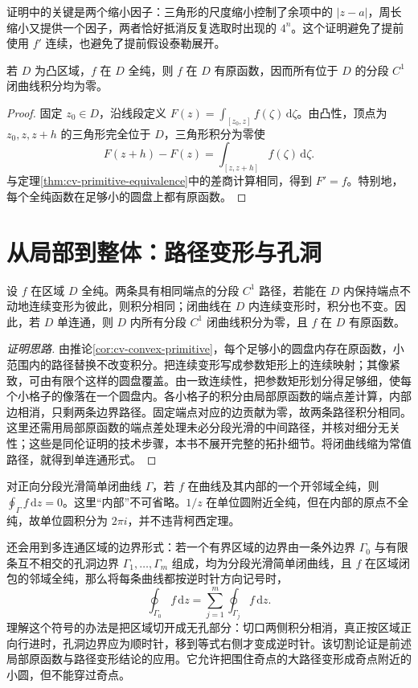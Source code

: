 \documentclass[UTF8,12pt,a4paper,fontset=fandol]{ctexbook}
\begin{document}
证明中的关键是两个缩小因子：三角形的尺度缩小控制了余项中的 $|z-a|$，周长缩小又提供一个因子，两者恰好抵消反复选取时出现的 $4^n$。这个证明避免了提前使用 $f'$ 连续，也避免了提前假设泰勒展开。

\begin{corollary}[凸区域上的原函数]
\label{cor:cv-convex-primitive}
若 $D$ 为凸区域，$f$ 在 $D$ 全纯，则 $f$ 在 $D$ 有原函数，因而所有位于 $D$ 的分段 $C^1$ 闭曲线积分均为零。
\end{corollary}
\begin{proof}
固定 $z_0\in D$，沿线段定义 $F(z)=\int_{[z_0,z]}f(\zeta)\,\mathrm d\zeta$。由凸性，顶点为 $z_0,z,z+h$ 的三角形完全位于 $D$，三角形积分为零使
\[
 F(z+h)-F(z)=\int_{[z,z+h]}f(\zeta)\,\mathrm d\zeta.
\]
与定理\ref{thm:cv-primitive-equivalence}中的差商计算相同，得到 $F'=f$。特别地，每个全纯函数在足够小的圆盘上都有原函数。
\end{proof}

\section{从局部到整体：路径变形与孔洞}

\begin{theorem}[同伦不变性与单连通形式]
\label{thm:cv-cauchy-domain}
设 $f$ 在区域 $D$ 全纯。两条具有相同端点的分段 $C^1$ 路径，若能在 $D$ 内保持端点不动地连续变形为彼此，则积分相同；闭曲线在 $D$ 内连续变形时，积分也不变。因此，若 $D$ 单连通，则 $D$ 内所有分段 $C^1$ 闭曲线积分为零，且 $f$ 在 $D$ 有原函数。
\end{theorem}
\begin{proof}[证明思路]
由推论\ref{cor:cv-convex-primitive}，每个足够小的圆盘内存在原函数，小范围内的路径替换不改变积分。把连续变形写成参数矩形上的连续映射；其像紧致，可由有限个这样的圆盘覆盖。由一致连续性，把参数矩形划分得足够细，使每个小格子的像落在一个圆盘内。各小格子的积分由局部原函数的端点差计算，内部边相消，只剩两条边界路径。固定端点对应的边贡献为零，故两条路径积分相同。这里还需用局部原函数的端点差处理未必分段光滑的中间路径，并核对细分无关性；这些是同伦证明的技术步骤，本书不展开完整的拓扑细节。将闭曲线缩为常值路径，就得到单连通形式。
\end{proof}

对正向分段光滑简单闭曲线 $\Gamma$，若 $f$ 在曲线及其内部的一个开邻域全纯，则 $\oint_\Gamma f\,\mathrm dz=0$。这里“内部”不可省略。$1/z$ 在单位圆附近全纯，但在内部的原点不全纯，故单位圆积分为 $2\pi i$，并不违背柯西定理。

还会用到多连通区域的边界形式：若一个有界区域的边界由一条外边界 $\Gamma_0$ 与有限条互不相交的孔洞边界 $\Gamma_1,\ldots,\Gamma_m$ 组成，均为分段光滑简单闭曲线，且 $f$ 在区域闭包的邻域全纯，那么将每条曲线都按逆时针方向记号时，
\begin{equation}
 \oint_{\Gamma_0}f\,\mathrm dz
 =\sum_{j=1}^m\oint_{\Gamma_j}f\,\mathrm dz.
 \label{eq:cv-boundary-deformation}
\end{equation}
理解这个符号的办法是把区域切开成无孔部分：切口两侧积分相消，真正按区域正向行进时，孔洞边界应为顺时针，移到等式右侧才变成逆时针。该切割论证是前述局部原函数与路径变形结论的应用。它允许把围住奇点的大路径变形成奇点附近的小圆，但不能穿过奇点。
\end{document}
